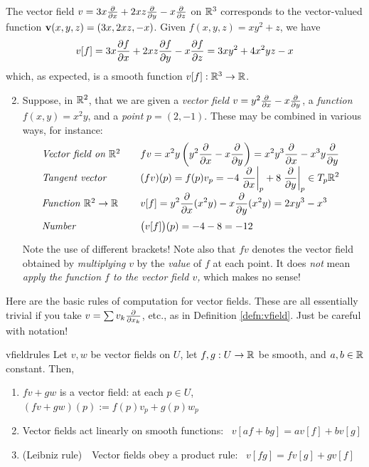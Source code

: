 \begin{examples}{}{}
	\exstart The vector field $v=3x\partials{x}+2xz\partials{y}-x\partials{z}$ on $\R^3$ corresponds to the vector-valued function $\vv(x,y,z)=(3x,2xz,-x)$. Given $f(x,y,z)=xy^2+z$, we have
	\[
		v[f]=3x\partials[f]{x}+2xz\partials[f]{y}-x\partials[f]{z}=3xy^2+4x^2yz-x
	\]
	which, as expected, is a smooth function $v[f]:\R^3\to\R$.
	
	\begin{enumerate}\setcounter{enumi}{1}
		\item Suppose, in $\R^2$, that we are given a \emph{vector field} $v=y^2\partials{x}-x\partials{y}$, a \emph{function} $f(x,y)=x^2y$, and a \emph{point} $p=(2,-1)$. These may be combined in various ways, for instance:
		\[
			\def\arraystretch{1.7}
			\begin{array}{@{}l@{\qquad}l}
				\text{\emph{Vector field on $\R^2$}} & \displaystyle fv=x^2y\left(y^2\partials{x}-x\partials{y}\right) =x^2y^3\partials{x}-x^3y\partials{y} \\
	 			\text{\emph{Tangent vector}} & \displaystyle (fv)(p)=f(p) v_p=-4\partialsat{x}p+8\partialsat{y}p \in T_p\R^2 \\
				\text{\emph{Function} $\R^2\to\R$} & \displaystyle v[f]=y^2\partials{x}(x^2y)-x\partials{y}(x^2y)=2xy^3-x^3 \\
	 			\text{\emph{Number}} & \displaystyle \bigl(v[f]\bigr)(p) =-4-8=-12
			\end{array}
		\]
		Note the use of different brackets! Note also that $fv$ denotes the vector field obtained by \emph{multiplying} $v$ by the \emph{value} of $f$ at each point. It does \emph{not} mean \emph{apply the function $f$ to the vector field $v$,} which makes no sense!
	\end{enumerate}
\end{examples}

\goodbreak

Here are the basic rules of computation for vector fields. These are all essentially trivial if you take $v=\sum v_k\partials{x_k}$, etc., as in Definition \ref{defn:vfield}. Just be careful with notation!

\begin{lemm}{}{vfieldrules}
	Let $v,w$ be vector fields on $U$, let $f,g:U\to\R$ be smooth, and $a,b\in\R$ constant. Then,
	\begin{enumerate}
	  \item $fv+gw$ is a vector field: at each $p\in U$, $(fv+gw)(p):=f(p)v_p+g(p)w_p$
		\item Vector fields act linearly on smooth functions: \ $v[af+bg]=av[f]+bv[g]$
		\item (Leibniz rule)\ \ Vector fields obey a product rule: \ $v[fg]=fv[g]+gv[f]$
	\end{enumerate} 
\end{lemm}


